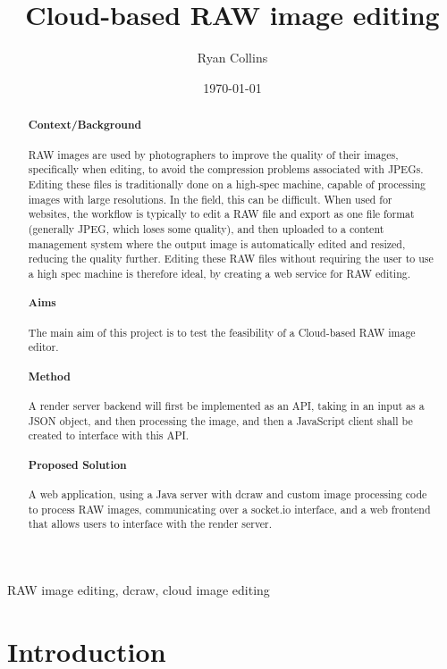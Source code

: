 \documentclass[12pt,a4paper]{article}
\title{Cloud-based RAW image editing}
\author{Ryan Collins}
\date{\today}
\begin{document}
\maketitle

\begin{abstract}
\paragraph{Context/Background}
RAW images are used by photographers to improve the quality of their images, specifically
when editing, to avoid the compression problems associated with JPEGs. Editing these
files is traditionally done on a high-spec machine, capable of processing images with large
resolutions. In the field, this can be difficult. When used for websites, the workflow is typically
to edit a RAW file and export as one file format (generally JPEG, which loses some quality), and then uploaded to a content management system where
the output image is automatically edited and resized, reducing the quality further. Editing these RAW files without requiring the user to use a high spec
machine is therefore ideal, by creating a web service for RAW editing.
\paragraph{Aims}
The main aim of this project is to test the feasibility of a Cloud-based RAW image
editor.
\paragraph{Method}
A render server backend will first be implemented as an API, taking in an input as a
JSON object, and then processing the image, and then a JavaScript
client shall be created to interface with this API.
\paragraph{Proposed Solution}
A web application, using a Java server with dcraw and custom image processing code to
process RAW images, communicating over a socket.io interface, and a web frontend that allows
users to interface with the render server.
\end{abstract}

\begin{keywords}
RAW image editing, dcraw, cloud image editing
\end{keywords}

\section{Introduction}
\end{document}
